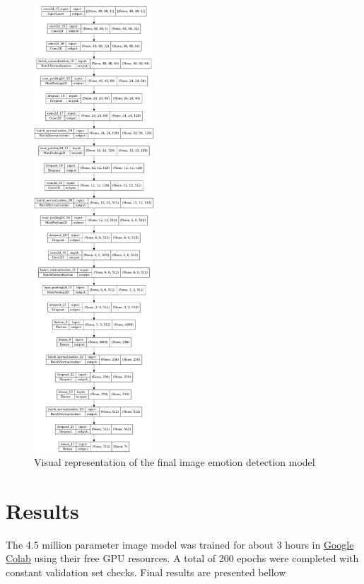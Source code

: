 \documentclass{ledger}
\begin{document}
\begin{figure}[H]
	\centering
	\includegraphics[width=0.4\textwidth]{assets/images_model.png}
	\caption{Visual representation of the final image emotion detection model}
	\label{fig:images-model}
\end{figure}



\section{Results}

The 4.5 million parameter image model was trained for about 3 hours in \href{https://research.google.com/colaboratory}{Google Colab} using their free GPU resources. A total of 200 epochs were completed with constant validation set checks. Final results are presented bellow
\end{document}

